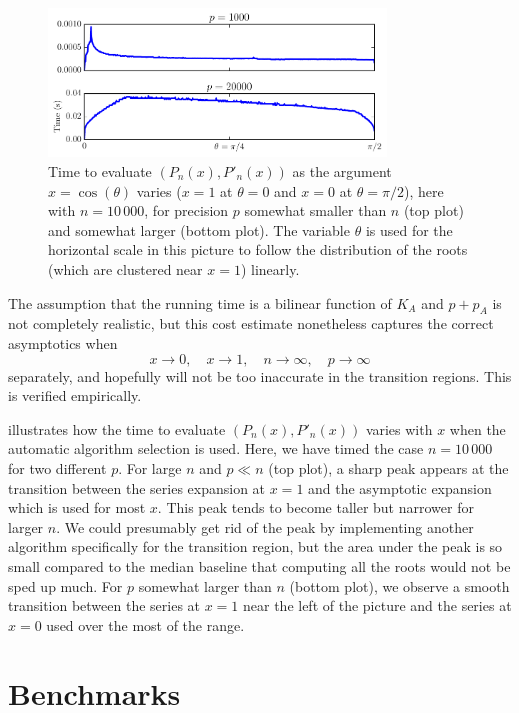 \documentclass[nohypdvips,review]{siamart0216}
\begin{document}
\begin{figure}
\begin{centering}
\includegraphics[width=0.8\textwidth]{timeplot}
\caption{Time to evaluate $(P_n(x), P'_n(x))$ as the argument $x = \cos(\theta)$ varies ($x = 1$ at $\theta = 0$ and $x = 0$ at $\theta = \pi/2$), here with $n = 10\,000$, for
precision $p$ somewhat smaller than $n$ (top plot) and somewhat larger (bottom plot). The variable $\theta$ is used for the horizontal scale in this picture
to follow the distribution of the roots (which are clustered near $x = 1$) linearly.}
\label{fig:timeplot}
\end{centering}
\end{figure}

The assumption that the running time is a bilinear function of $K_A$ and $p + p_A$
is not completely realistic, but this cost estimate nonetheless captures the
correct asymptotics when
$$x \to 0, \quad x \to 1, \quad n \to \infty, \quad p \to \infty$$
separately, and hopefully will not be too inaccurate in the transition regions.
This is verified empirically.

 illustrates how the time to evaluate
$(P_n(x), P'_n(x))$ varies with $x$ when the automatic algorithm selection is used.
Here, we have timed the case $n = 10\,000$ for two different $p$.
For large $n$ and $p \ll n$ (top plot), a sharp peak appears at the transition between the series
expansion at $x = 1$ and the asymptotic expansion which is used for most $x$.
This peak tends to become taller
but narrower for larger $n$.
We could presumably get rid of the peak by implementing another algorithm
specifically for the transition region, but the area under the peak is so small
compared to the median baseline that computing all the roots
would not be sped up much.
For $p$ somewhat larger than $n$ (bottom plot), we observe a smooth transition between the
series at $x = 1$ near the left of the picture and the series at $x = 0$
used over the most of the range.

\section{Benchmarks}
\end{document}
